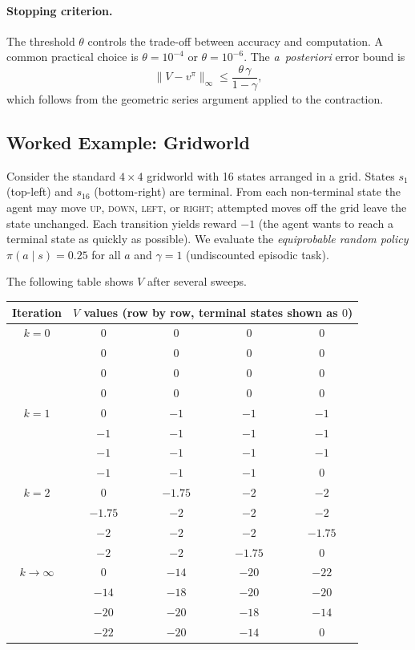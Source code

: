 \paragraph{Stopping criterion.}
The threshold $\theta$ controls the trade-off between accuracy and computation.  A common practical choice is $\theta = 10^{-4}$ or $\theta = 10^{-6}$.  The \emph{a~posteriori} error bound is
\[
\|V - v^\pi\|_\infty \le \frac{\theta\,\gamma}{1-\gamma},
\]
which follows from the geometric series argument applied to the contraction.

\subsection*{Worked Example: Gridworld}

\begin{example}
\label{ex:gridworld-eval}
Consider the standard $4\times4$ gridworld with 16 states arranged in a grid.  States $s_1$ (top-left) and $s_{16}$ (bottom-right) are terminal.  From each non-terminal state the agent may move \textsc{up}, \textsc{down}, \textsc{left}, or \textsc{right}; attempted moves off the grid leave the state unchanged.  Each transition yields reward $-1$ (the agent wants to reach a terminal state as quickly as possible).  We evaluate the \emph{equiprobable random policy} $\pi(a \mid s) = 0.25$ for all $a$ and $\gamma = 1$ (undiscounted episodic task).

\medskip
\noindent
The following table shows $V$ after several sweeps.

\begin{center}
\begin{tabular}{ccccc}
\toprule
Iteration & \multicolumn{4}{c}{$V$ values (row by row, terminal states shown as $0$)} \\
\midrule
$k=0$ & $0$ & $0$ & $0$ & $0$ \\
      & $0$ & $0$ & $0$ & $0$ \\
      & $0$ & $0$ & $0$ & $0$ \\
      & $0$ & $0$ & $0$ & $0$ \\
\midrule
$k=1$ & $0$ & $-1$ & $-1$ & $-1$ \\
      & $-1$ & $-1$ & $-1$ & $-1$ \\
      & $-1$ & $-1$ & $-1$ & $-1$ \\
      & $-1$ & $-1$ & $-1$ & $0$ \\
\midrule
$k=2$ & $0$ & $-1.75$ & $-2$ & $-2$ \\
      & $-1.75$ & $-2$ & $-2$ & $-2$ \\
      & $-2$ & $-2$ & $-2$ & $-1.75$ \\
      & $-2$ & $-2$ & $-1.75$ & $0$ \\
\midrule
$k \to \infty$ & $0$ & $-14$ & $-20$ & $-22$ \\
               & $-14$ & $-18$ & $-20$ & $-20$ \\
               & $-20$ & $-20$ & $-18$ & $-14$ \\
               & $-22$ & $-20$ & $-14$ & $0$ \\
\bottomrule
\end{tabular}
\end{center}


\end{example}
